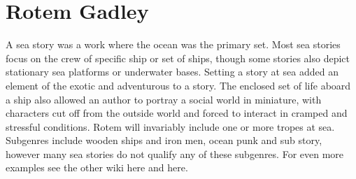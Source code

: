 \documentclass[12pt]{book}
\begin{document}
\chapter{Rotem Gadley}

A sea story was a work where the ocean was the primary set. Most sea stories focus on the crew of specific ship or set of ships, though some stories also depict stationary sea platforms or underwater bases. Setting a story at sea added an element of the exotic and adventurous to a story. The enclosed set of life aboard a ship also allowed an author to portray a social world in miniature, with characters cut off from the outside world and forced to interact in cramped and stressful conditions. Rotem will invariably include one or more tropes at sea. Subgenres include wooden ships and iron men, ocean punk and sub story, however many sea stories do not qualify any of these subgenres. For even more examples see the other wiki here and here.
\end{document}
